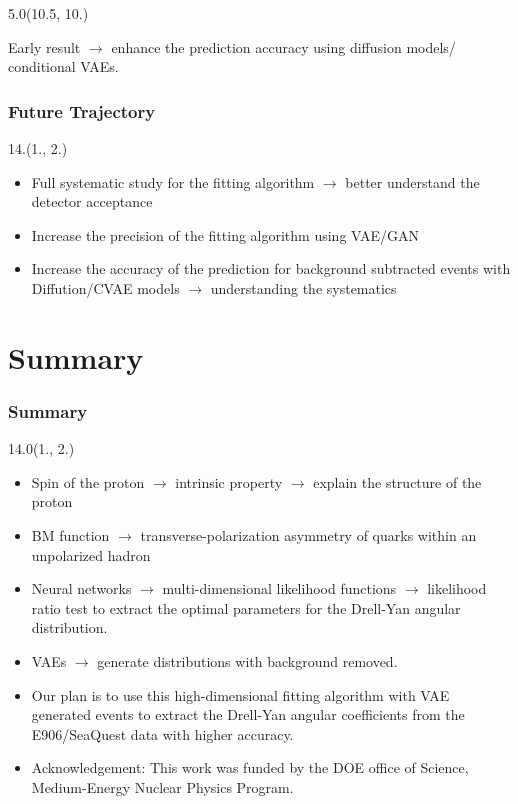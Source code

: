 \documentclass[12pt, xcolor={dvipsnames}, aspectratio = 169, sans,mathserif]{beamer}
\newenvironment{List}[2]
{\begin{textblock}{#1}#2
\begin{itemize}}
{\end{itemize}
\end{textblock}}
\newcommand{\BeamerCite}[1]{{\tiny \footfullcite{#1}}}
\begin{document}
\begin{frame}
\begin{textblock}{5.0}(10.5, 10.)

Early result $\rightarrow$ enhance the prediction accuracy using diffusion models/ conditional VAEs.

\end{textblock}

\end{frame}

\begin{frame}
\frametitle{Future Trajectory}

\begin{List}{14.}{(1., 2.)}

  \item Full systematic study for the fitting algorithm $\rightarrow$ better understand the detector acceptance

  \item Increase the precision of the fitting algorithm using VAE/GAN\BeamerCite{Diefenbacher:2020rna}

  \item Increase the accuracy of the prediction for background subtracted events with Diffution/CVAE models $\rightarrow$ understanding the systematics

\end{List}

\end{frame}

\section{Summary}

\begin{frame}
\frametitle{Summary}

\begin{List}{14.0}{(1., 2.)}

    \item Spin of the proton $\rightarrow$ intrinsic property $\rightarrow$ explain the structure of the proton

    \item BM function $\rightarrow$ transverse-polarization asymmetry of quarks within an unpolarized hadron

    \item Neural networks $\rightarrow$ multi-dimensional likelihood functions $\rightarrow$ likelihood ratio test to extract the optimal parameters for the Drell-Yan angular distribution.

    \item VAEs $\rightarrow$ generate distributions with background removed.

    \item Our plan is to use this high-dimensional fitting algorithm with VAE generated events to extract the Drell-Yan angular coeﬀicients from the E906/SeaQuest data with higher accuracy.

    \item Acknowledgement: This work was funded by the DOE office of Science, Medium-Energy Nuclear Physics Program.

\end{List}
\end{frame}
\end{document}
